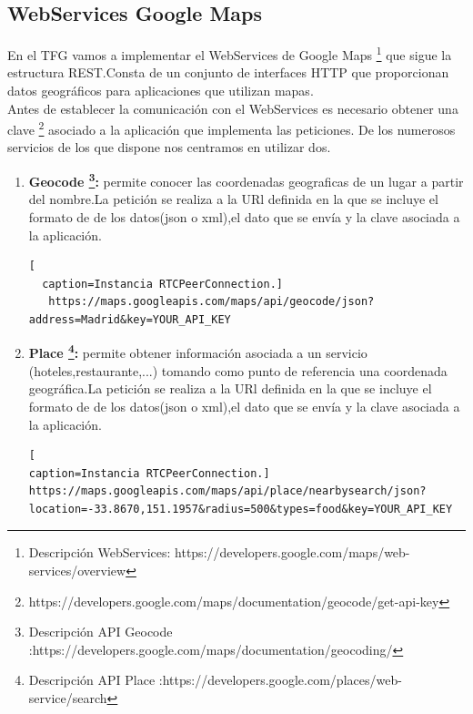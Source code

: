 \subsection{WebServices Google Maps}
En el TFG vamos a implementar el WebServices de Google Maps \footnote{Descripción WebServices: https://developers.google.com/maps/web-services/overview} que sigue la estructura REST.Consta de un conjunto de interfaces HTTP que proporcionan datos geográficos para aplicaciones que utilizan mapas.
\\Antes de establecer la comunicación con el WebServices es necesario obtener una clave \footnote{https://developers.google.com/maps/documentation/geocode/get-api-key} asociado a la aplicación que implementa las peticiones.
De los numerosos servicios de los que dispone nos centramos en utilizar dos.
\begin{enumerate}
\item \textbf{Geocode \footnote{Descripción API Geocode :https://developers.google.com/maps/documentation/geocoding/}:} permite conocer las coordenadas geograficas de un lugar a partir del nombre.La petición se realiza a la URl definida  en la que se incluye el formato de de los datos(json o xml),el dato que se envía y la clave asociada a la aplicación.
  \begin{lstlisting}[
  caption=Instancia RTCPeerConnection.]
   https://maps.googleapis.com/maps/api/geocode/json?address=Madrid&key=YOUR_API_KEY
  \end{lstlisting}
 \item \textbf{Place \footnote{Descripción API Place :https://developers.google.com/places/web-service/search}:} permite obtener información asociada a un servicio (hoteles,restaurante,...) tomando como punto de referencia una coordenada geográfica.La petición se realiza a la URl definida en la que se incluye el formato de de los datos(json o xml),el dato que se envía y la clave asociada a la aplicación.
\begin{lstlisting}[
caption=Instancia RTCPeerConnection.]
https://maps.googleapis.com/maps/api/place/nearbysearch/json?location=-33.8670,151.1957&radius=500&types=food&key=YOUR_API_KEY
\end{lstlisting}
\end{enumerate} 
